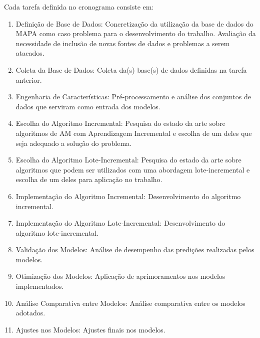 Cada tarefa definida no cronograma consiste em:
\begin{enumerate}
\item Definição de Base de Dados: Concretização da utilização da base de dados do MAPA como caso problema para o desenvolvimento do trabalho. Avaliação da necessidade de inclusão de novas fontes de dados e problemas a serem atacados.
\item Coleta da Base de Dados: Coleta da(s) base(s) de dados definidas na tarefa anterior.
\item Engenharia de Características: Pré-processamento e análise dos conjuntos de dados que serviram como entrada dos modelos.
\item Escolha do Algoritmo Incremental: Pesquisa do estado da arte sobre algoritmos de AM com Aprendizagem Incremental e escolha de um deles que seja adequado a solução do problema.
\item Escolha do Algoritmo Lote-Incremental: Pesquisa do estado da arte sobre algoritmos que podem ser utilizados com uma abordagem lote-incremental e escolha de um deles para aplicação no trabalho.
\item Implementação do Algoritmo Incremental: Desenvolvimento do algoritmo incremental.
\item Implementação do Algoritmo Lote-Incremental: Desenvolvimento do algoritmo lote-incremental.
\item Validação dos Modelos: Análise de desempenho das predições realizadas pelos modelos.
\item Otimização dos Modelos: Aplicação de aprimoramentos nos modelos implementados.
\item Análise Comparativa entre Modelos: Análise comparativa entre os modelos adotados.
\item Ajustes nos Modelos: Ajustes finais nos modelos.
\end{enumerate}